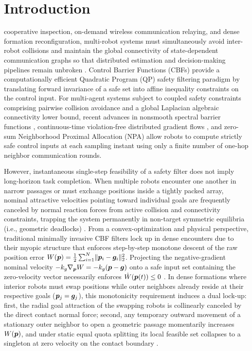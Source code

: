 \section{Introduction}\label{sec:intro}

 cooperative inspection, on-demand wireless communication relaying, and dense formation reconfiguration, multi-robot systems must simultaneously avoid inter-robot collisions and maintain the global connectivity of state-dependent communication graphs so that distributed estimation and decision-making pipelines remain unbroken \cite{yang2010decentralized,sabattini2013decentralized,ong2021connectivity}. Control Barrier Functions (CBFs) \cite{ames2017cbf,breeden2022sampled} provide a computationally efficient Quadratic Program (QP) safety filtering paradigm by translating forward invariance of a safe set into affine inequality constraints on the control input. For multi-agent systems subject to coupled safety constraints comprising pairwise collision avoidance and a global Laplacian algebraic connectivity lower bound, recent advances in nonsmooth spectral barrier functions \cite{ong2021connectivity}, continuous-time violation-free distributed gradient flows \cite{tan2025violationfree}, and zero-sum Neighborhood Proximal Allocation (NPA) allow robots to compute strictly safe control inputs at each sampling instant using only a finite number of one-hop neighbor communication rounds.

However, instantaneous single-step feasibility of a safety filter does not imply long-horizon task completion. When multiple robots encounter one another in narrow passages or must exchange positions inside a tightly packed array, nominal attractive velocities pointing toward individual goals are frequently canceled by normal reaction forces from active collision and connectivity constraints, trapping the system permanently in non-target symmetric equilibria (i.e., geometric deadlocks) \cite{reis2021,grover2023deadlock,tan2024equilibria,mestres2026filters}. From a convex-optimization and physical perspective, traditional minimally invasive CBF filters lock up in dense encounters due to their myopic structure that enforces step-by-step monotone descent of the raw position error $W(\boldsymbol{p})=\frac12\sum_{i=1}^N\lVert\boldsymbol{p}_i-\boldsymbol{g}_i\rVert_2^2$. Projecting the negative-gradient nominal velocity $-k_g\nabla_{\boldsymbol{p}}W=-k_g(\boldsymbol{p}-\boldsymbol{g})$ onto a safe input set containing the zero-velocity vector necessarily enforces $\dot W(\boldsymbol{p}(t))\le 0$ \cite{allibhoy2024safegradient}. In dense formations where interior robots must swap positions while outer neighbors already reside at their respective goals ($\boldsymbol{p}_j=\boldsymbol{g}_j$), this monotonicity requirement induces a dual lock-up: first, the radial goal attraction of the swapping robots is collinearly canceled by the direct contact normal force; second, any temporary outward movement of a stationary outer neighbor to open a geometric passage momentarily increases $W(\boldsymbol{p})$, and under static equal quota splitting its local feasible set collapses to a singleton at zero velocity on the contact boundary \cite{karagoz2014navigation}.

